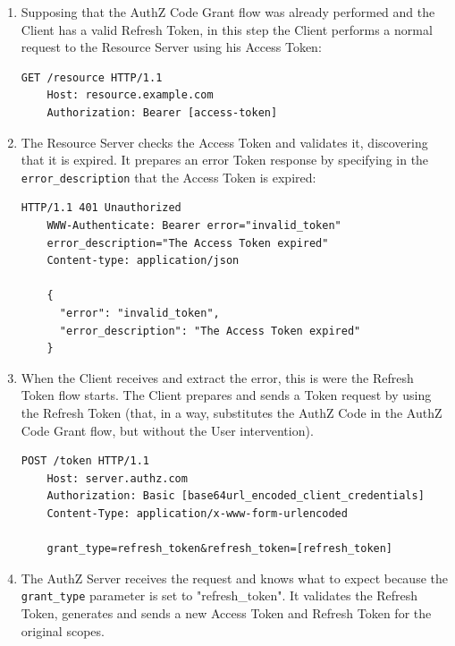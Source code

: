 \documentclass[a4paper,12pt]{article}
\begin{document}
\begin{enumerate}
    \item Supposing that the AuthZ Code Grant flow was already performed and the Client has a valid Refresh Token, in this step the Client performs a normal request to the Resource Server using his Access Token:
    
    \begin{lstlisting}[basicstyle=\ttfamily]
    GET /resource HTTP/1.1
    Host: resource.example.com
    Authorization: Bearer [access-token]
    \end{lstlisting}
    
    
    \item The Resource Server checks the Access Token and validates it, discovering that it is expired. It prepares an error Token response by specifying in the \texttt{error\_description} that the Access Token is expired:
    
    \begin{lstlisting}[basicstyle=\ttfamily]
    HTTP/1.1 401 Unauthorized
    WWW-Authenticate: Bearer error="invalid_token"
    error_description="The Access Token expired"
    Content-type: application/json
 
    {
      "error": "invalid_token",
      "error_description": "The Access Token expired"
    }
    \end{lstlisting}
    
    \item When the Client receives and extract the error, this is were the Refresh Token flow starts. The Client prepares and sends a Token request by using the Refresh Token (that, in a way, substitutes the AuthZ Code in the AuthZ Code Grant flow, but without the User intervention).
    
    \begin{lstlisting}[basicstyle=\ttfamily]
    POST /token HTTP/1.1
    Host: server.authz.com
    Authorization: Basic [base64url_encoded_client_credentials]
    Content-Type: application/x-www-form-urlencoded
    
    grant_type=refresh_token&refresh_token=[refresh_token]
    \end{lstlisting}
    
    
    \item The AuthZ Server receives the request and knows what to expect because the \texttt{grant\_type} parameter is set to "refresh\_token". It validates the Refresh Token, generates and sends a new Access Token and Refresh Token for the original scopes.
    

\end{enumerate}
\end{document}
